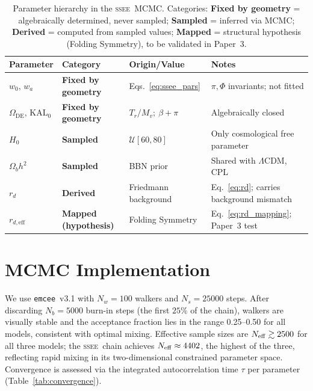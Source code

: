 \documentclass[12pt,a4paper]{article}
\newcommand{\SSEE}{\ifmmode\mathrm{SSEE}\else\textsc{ssee}\fi}
\newcommand{\LCDM}{\ifmmode\Lambda\mathrm{CDM}\else$\Lambda$CDM\fi}
\newcommand{\KALz}{\mathrm{KAL}_0}
\newcommand{\wz}{w_0}
\newcommand{\wa}{w_a}
\newcommand{\OmDE}{\Omega_{\mathrm{DE}}}
\newcommand{\rdeff}{r_{d,\mathrm{eff}}}
\begin{document}
\begin{table}[H]
\centering
\caption{Parameter hierarchy in the \SSEE\ MCMC. Categories:
\textbf{Fixed by geometry} = algebraically determined, never sampled;
\textbf{Sampled} = inferred via MCMC; \textbf{Derived} = computed from
sampled values; \textbf{Mapped} = structural hypothesis (Folding
Symmetry), to be validated in Paper~3.}
\label{tab:param_hierarchy}
\begin{tabular}{@{}lllp{4.2cm}@{}}
\toprule
Parameter & Category & Origin/Value & Notes \\
\midrule
$\wz,\,\wa$          & \textbf{Fixed by geometry} & Eqs.~\eqref{eq:ssee_pars} & $\pi,\Phi$ invariants; not fitted \\
$\OmDE,\,\KALz$      & \textbf{Fixed by geometry} & $T_r/M_v;\ \beta+\pi$     & Algebraically closed \\
$H_0$                & \textbf{Sampled}           & $\mathcal{U}[60,80]$      & Only cosmological free parameter \\
$\Omega_b h^2$       & \textbf{Sampled}           & BBN prior                 & Shared with \LCDM, CPL \\
$r_d$                & \textbf{Derived}           & Friedmann background      & Eq.~\eqref{eq:rd}; carries background mismatch \\
$\rdeff$             & \textbf{Mapped (hypothesis)}& Folding Symmetry         & Eq.~\eqref{eq:rd_mapping}; Paper~3 test \\
\bottomrule
\end{tabular}
\end{table}

\section{MCMC Implementation}
\label{sec:mcmc}

We use \texttt{emcee}~v3.1 \citep{emcee} with $N_w=100$ walkers and
$N_s=25000$ steps. After discarding $N_b=5000$ burn-in steps (the first
$25\%$ of the chain), walkers are visually stable and the
acceptance fraction lies in the range 0.25--0.50 for all models,
consistent with optimal mixing. Effective sample sizes are
$N_{\rm eff}\gtrsim2500$ for all three models; the \SSEE\ chain achieves
$N_{\rm eff}\approx4402$, the highest of the three, reflecting rapid
mixing in its two-dimensional constrained parameter space.
Convergence is assessed via the integrated autocorrelation time $\tau$
per parameter (Table~\ref{tab:convergence}).
\end{document}

